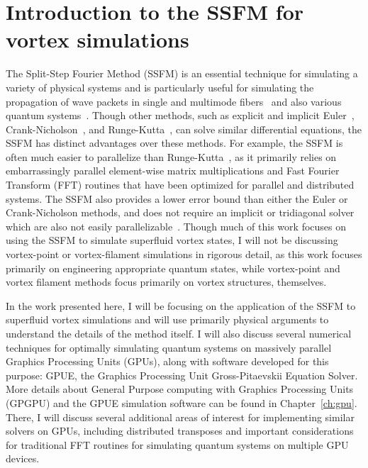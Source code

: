 \chapter{Introduction to the SSFM for vortex simulations}
\label{ch:splitop}
The Split-Step Fourier Method (SSFM) is an essential technique for simulating a variety of physical systems and is particularly useful for simulating the propagation of wave packets in single and multimode fibers~\cite{agrawal2000, sinkin2003, meirelles2005, min2003} and also various quantum systems~\cite{bayindir2015, weideman1986, wang2005}.
Though other methods, such as explicit and implicit Euler~\cite{butcher2016}, Crank-Nicholson~\cite{crank1947}, and Runge-Kutta~\cite{butcher2016}, can solve similar differential equations, the SSFM has distinct advantages over these methods.
For example, the SSFM is often much easier to parallelize than Runge-Kutta~\cite{brehler2017}, as it primarily relies on embarrassingly parallel element-wise matrix multiplications and Fast Fourier Transform (FFT) routines that have been optimized for parallel and distributed systems.
The SSFM also provides a lower error bound than either the Euler or Crank-Nicholson methods, and does not require an implicit or tridiagonal solver \cite{conte2017, thomas1949} which are also not easily parallelizable~\cite{goddeke2010, wang1981, sweet1977}.
Though much of this work focuses on using the SSFM to simulate superfluid vortex states, I will not be discussing vortex-point or vortex-filament simulations in rigorous detail, as this work focuses primarily on engineering appropriate quantum states, while vortex-point and vortex filament methods focus primarily on vortex structures, themselves.

In the work presented here, I will be focusing on the application of the SSFM to superfluid vortex simulations and will use primarily physical arguments to understand the details of the method itself.
I will also discuss several numerical techniques for optimally simulating quantum systems on massively parallel Graphics Processing Units (GPUs), along with software developed for this purpose: GPUE, the Graphics Processing Unit Gross-Pitaevskii Equation Solver.
More details about General Purpose computing with Graphics Processing Units (GPGPU) and the GPUE simulation software can be found in Chapter~\ref{ch:gpu}.
There, I will discuss several additional areas of interest for implementing similar solvers on GPUs, including distributed transposes and important considerations for traditional FFT routines for simulating quantum systems on multiple GPU devices.


